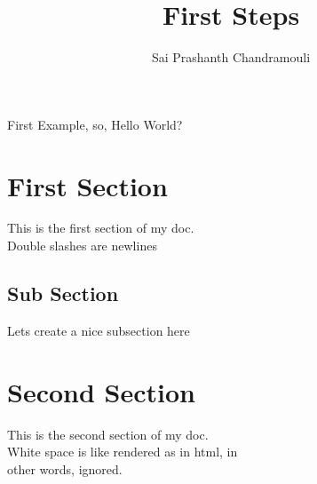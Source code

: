 \documentclass[a4paper,62pt]{article}
\author{Sai Prashanth Chandramouli}
\title{First Steps}
\begin{document}
	\maketitle
	First Example, so, Hello World?
	\tableofcontents
	\section{First Section}
		This is the first section of my doc.\\
		Double slashes are newlines
		\subsection[Sub Short]{Sub Section}
			Lets create a nice subsection here
	\section[Short Title]{Second Section}	
		This is the second section of my doc.\\
		White space is like rendered as in html, in\\
		other words, ignored.
\end{document}
